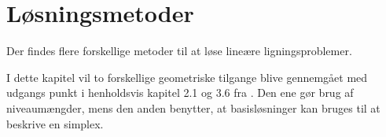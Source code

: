 \chapter{Løsningsmetoder}	
Der findes flere forskellige metoder til at løse lineære ligningsproblemer. 

I dette kapitel vil to forskellige geometriske tilgange blive gennemgået med udgangs punkt i henholdsvis %
kapitel 2.1 og 3.6 fra \citep{bert}.
Den ene gør brug af niveaumængder, mens den anden benytter, at basisløsninger kan bruges til at beskrive en simplex.




%





